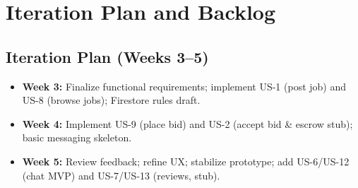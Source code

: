 \documentclass[11pt]{article}
\begin{document}
\section{Iteration Plan and Backlog}

\subsection{Iteration Plan (Weeks 3--5)}
\begin{itemize}[leftmargin=1.4em]
  \item \textbf{Week 3:} Finalize functional requirements; implement US-1 (post job) and US-8 (browse jobs); Firestore rules draft.
  \item \textbf{Week 4:} Implement US-9 (place bid) and US-2 (accept bid \& escrow stub); basic messaging skeleton.
  \item \textbf{Week 5:} Review feedback; refine UX; stabilize prototype; add US-6/US-12 (chat MVP) and US-7/US-13 (reviews, stub).
\end{itemize}
\end{document}
